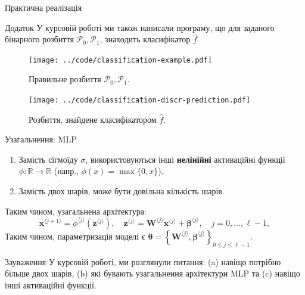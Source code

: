 \documentclass{zkdl-presentation-template}
\begin{document}
    \begin{frame}{Практична реалізація}
        \begin{alertblock}{Додаток}
            У курсовій роботі ми також написали програму, що для заданого
            бінарного розбиття $\mathcal{P}_0,\mathcal{P}_1$, знаходить
            класифікатор $\hat{f}$.
        \end{alertblock}

        \begin{figure}
            \begin{minipage}{0.475\textwidth}
                \centering
                \texttt{[image: ../code/classification-example.pdf]}
                \caption{Правильне розбиття $\mathcal{P}_0,\mathcal{P}_1$.}
            \end{minipage}\hfill
            \begin{minipage}{0.475\textwidth}
                \centering
                \texttt{[image: ../code/classification-discr-prediction.pdf]}
                \caption{Розбиття, знайдене класифікатором $\hat{f}$.}
            \end{minipage}
        \end{figure}
    \end{frame}

    \begin{frame}{Узагальнення: MLP}
        \begin{enumerate}
            \item Замість сігмоїду $\sigma$, використовуються інші \textbf{нелінійні}
            активаційні функції $\phi: \mathbb{R} \to \mathbb{R}$ (напр., $\phi(x) = \max\{0,x\}$).
            \item Замість двох шарів, може бути довільна кількість шарів.
        \end{enumerate}

        \begin{definition}\label{def:mlp}
            Таким чином, узагальнена архітектура:
            \begin{equation*}
                \boldsymbol{x}^{\langle j+1 \rangle} = \phi^{\langle j \rangle}(\boldsymbol{z}^{\langle j \rangle}), \quad \boldsymbol{z}^{\langle j \rangle} = \boldsymbol{W}^{\langle j \rangle}\boldsymbol{x}^{\langle j \rangle} + \boldsymbol{\beta}^{\langle j \rangle}, \quad j = 0,\dots,\ell-1,
            \end{equation*}
            Таким чином, параметризація моделі є $\boldsymbol{\theta} =
            \left\{\boldsymbol{W}^{\langle j \rangle},\boldsymbol{\beta}^{\langle j
            \rangle}\right\}_{0 \leq j \leq \ell-1}$.
        \end{definition}

        \begin{alertblock}{Зауваження}
            У курсовій роботі, ми розглянули питання: (a) навіщо потрібно більше двох шарів, (b) які бувають узагальнення архітектури MLP та (c) навіщо інші активаційні функції.
        \end{alertblock}
    \end{frame}
\end{document}
